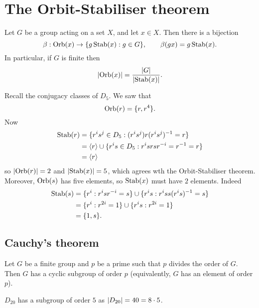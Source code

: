 \chapter{The Orbit-Stabiliser theorem}

\begin{theorem}[]
    Let $G$ be a group acting on a set $X$, and let $x \in X$.
    Then there is a bijection
    \[
        \beta: \operatorname{Orb}(x) \to \{g\operatorname{Stab}(x): g\in G\}, \qquad \beta(gx) = g\operatorname{Stab}(x).
    \]
    In particular, if $G$ is finite then
    \[
        \left\lvert\operatorname{Orb}(x)\right\rvert = \frac{\left\lvert G\right\rvert}{\left\lvert\operatorname{Stab}(x)\right\rvert}.
    \]
\end{theorem}

\begin{example}
    Recall the conjugacy classes of $D_5$.
    We saw that
    \[
        \operatorname{Orb}(r) = \{r, r^4\}.
    \]
    Now
    \begin{align*}
        \operatorname{Stab}(r) 
        &= \{r^i s^j \in D_5: (r^i s^j) r (r^i s^j)^{-1} = r\} \\
        &= \langle r \rangle \cup \{r^is \in D_5: r^is r sr^{-i} = r^{-1} = r\} \\
        &= \langle r \rangle
    \end{align*}
    so $\left\lvert\operatorname{Orb}(r)\right\rvert = 2$ and $\left\lvert\operatorname{Stab}(x)\right\rvert = 5$, 
    which agrees wth the Orbit-Stabiliser theorem.
    Moreover, $\operatorname{Orb}(s)$ has five elements, 
    so $\operatorname{Stab}(x)$ must have $2$ elements.
    Indeed
    \begin{align*}
        \operatorname{Stab}(s)
        &= \{r^i : r^isr^{-i} = s\} \cup \{r^is: r^iss(r^is)^{-1}=s\} \\
        &= \{r^i : r^{2i} = 1\} \cup \{r^is : r^{2i} = 1\} \\
        &= \{1, s\}.
    \end{align*}
\end{example}

\section{Cauchy's theorem}

\begin{theorem}[Cauchy]
    Let $G$ be a finite group and $p$ be a prime such that $p$ divides
    the order of $G$.
    Then $G$ has a cyclic subgroup of order $p$
    (equivalently, $G$ has an element of order $p$).
\end{theorem}

\begin{example}
    $D_{20}$ has a subgroup of order $5$ as $\left\lvert D_{20}\right\rvert = 40 = 8 \cdot 5$.
\end{example}
